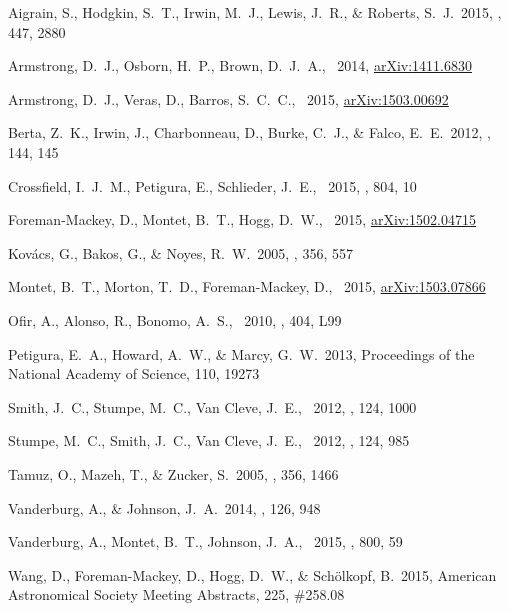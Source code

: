 \documentclass[12pt,preprint]{aastex}
\begin{document}
\clearpage
\newcommand{\arxiv}[1]{{\href{http://arxiv.org/abs/#1}{arXiv:{#1}}}}
\begin{thebibliography}{}\raggedright%

Aigrain, S., Hodgkin, S.~T., Irwin, M.~J., Lewis, J.~R., \& Roberts, S.~J.\
2015, \mnras, 447, 2880

Armstrong, D.~J., Osborn, H.~P., Brown, D.~J.~A., \etal\ 2014,
\arxiv{1411.6830}

Armstrong, D.~J., Veras, D., Barros, S.~C.~C., \etal\ 2015, \arxiv{1503.00692}

Berta, Z.~K., Irwin, J., Charbonneau, D., Burke, C.~J., \& Falco, E.~E.\ 2012,
\aj, 144, 145

Crossfield, I.~J.~M., Petigura, E., Schlieder, J.~E., \etal\ 2015, \apj, 804,
10

Foreman-Mackey, D., Montet, B.~T., Hogg, D.~W., \etal\ 2015, \arxiv{1502.04715}

Kov{\'a}cs, G., Bakos, G., \& Noyes, R.~W.\ 2005, \mnras, 356, 557

Montet, B.~T., Morton, T.~D., Foreman-Mackey, D., \etal\ 2015,
\arxiv{1503.07866}

Ofir, A., Alonso, R., Bonomo, A.~S., \etal\ 2010, \mnras, 404, L99

Petigura, E.~A., Howard, A.~W., \& Marcy, G.~W.\ 2013,
Proceedings of the National Academy of Science, 110, 19273

Smith, J.~C., Stumpe, M.~C., Van Cleve, J.~E., \etal\ 2012, \pasp, 124, 1000

Stumpe, M.~C., Smith, J.~C., Van Cleve, J.~E., \etal\ 2012, \pasp, 124, 985

Tamuz, O., Mazeh, T., \& Zucker, S.\ 2005, \mnras, 356, 1466

Vanderburg, A., \& Johnson, J.~A.\ 2014, \pasp, 126, 948

Vanderburg, A., Montet, B.~T., Johnson, J.~A., \etal\ 2015, \apj, 800, 59

Wang, D., Foreman-Mackey, D., Hogg, D.~W., \& Sch{\"o}lkopf, B.\ 2015,
American Astronomical Society Meeting Abstracts, 225, \#258.08

\end{thebibliography}
\end{document}
